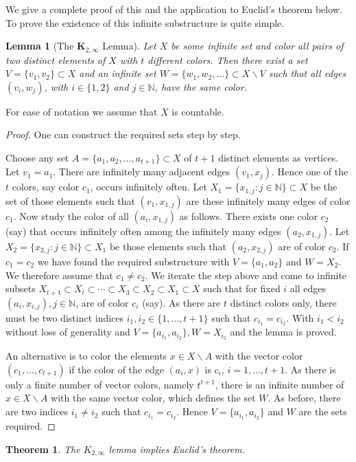 \documentclass{article}
\theoremstyle{theorem}
\newtheorem{theorem}{Theorem}
\newtheorem{lemma}{Lemma}
\theoremstyle{definition}
\newcommand{\N}{\mathbb N}
\begin{document}
We give a complete proof of this and the application to Euclid's theorem below.
To prove the existence of this infinite substructure is quite simple.
\begin{lemma}[The $\boldsymbol K_{2, \infty}$ Lemma]
Let $X$ be some infinite set and color all pairs of two distinct elements
of $X$
with $t$ different colors. Then there exist a set $V=\{v_1,v_2\}\subset X$ and
an infinite set $W=\{w_1,w_2, \ldots \}\subset X\backslash V$ such that all
edges $(v_i,w_j)$, with $i\in \{1,2\}$ and $j \in \N$, have the same color.
\end{lemma}
For ease of notation we assume that $X$ is countable.
\begin{proof}
One can construct the required sets step by step.

Choose any set $A=\{a_1, a_2, \ldots , a_{t+1}\}\subset X$ of $t+1$ distinct 
elements as vertices.
Let $v_1=a_1$. There are infinitely many adjacent edges $(v_1, x_j)$.
Hence one
of the $t$ colors, say color $c_1$, occurs infinitely often.
Let $X_1=\{x_{1,j}:j \in \N\} \subset X$ be the set of those elements such that
$(v_1, x_{1,j})$ are these infinitely many edges of color $c_1$.
Now study the color of all $(a_i, x_{1,j})$ as follows.
There exists one color $c_2$ (say) that occurs infinitely often among 
the infinitely many edges  $(a_2, x_{1,j})$. Let $X_2=\{x_{2,j}:j \in \N\} 
\subset X_1$ be those elements such that  $(a_2, x_{2,j})$ are of color $c_2$.
If $c_1=c_2$ we have found the
required substructure with $V=\{a_1,a_2\}$ and $W=X_2$.
We therefore assume that $c_1\neq c_2$.
We iterate the step above and come to infinite subsets
$X_{t+1} \subset X_t \subset \cdots \subset X_3\subset X_2 \subset X_1 
\subset X$ such that for fixed $i$ all 
edges $(a_i, x_{i,j}), j \in \N$, are of color $c_i$ (say).
As there are $t$ distinct colors only, there must be two distinct 
indices $i_1,i_2\in \{1, \ldots ,t+1\}$ such
that $c_{i_1}=c_{i_2}$. With $i_1 <i_2$ without loss of generality
and $V=\{a_{i_1}, a_{i_2}\}, W=X_{i_2}$ and the lemma is proved.

An alternative is to color the elements $x \in X\backslash A$ 
with the vector color $(c_1, \ldots, c_{t+1})$ if the color of the edge
$(a_i,x)$ is $c_i$, $i=1, \ldots , t+1$. 
As there is only a finite number of vector colors, namely
 $t^{t+1}$, there is an infinite
number of $x \in X\backslash A$ with the same vector color, which 
defines the set
$W$. As before, there
are two indices $i_1 \neq i_2$ such that $c_{i_1}=c_{i_2}$. Hence 
$V=\{a_{i_1}, a_{i_2}\}$ and $W$ are the sets required.
\end{proof}
\begin{theorem}{\label{thm:K2inf-implies-Euclid}}
The $K_{2,\infty}$ lemma implies Euclid's theorem.
\end{theorem}
\end{document}
